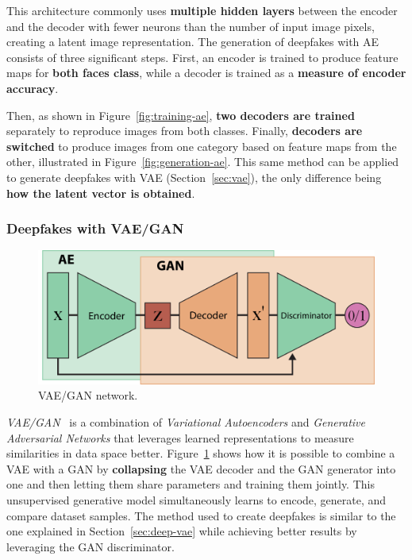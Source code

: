 \documentclass[sn-mathphys,Numbered]{sn-jnl}
\theoremstyle{thmstyleone}%
\theoremstyle{thmstyletwo}%
\theoremstyle{thmstylethree}%
\begin{document}
This architecture commonly uses \textbf{multiple hidden layers} between the encoder and the decoder with fewer neurons than the number of input image pixels, creating a latent image representation. 
The generation of deepfakes with AE consists of three significant steps.
First, an encoder is trained to produce feature maps for \textbf{both faces class}, while a decoder is trained as a \textbf{measure of encoder accuracy}. 

Then, as shown in Figure~\ref{fig:training-ae}, \textbf{two decoders are trained} separately to reproduce images from both classes. Finally, \textbf{decoders are switched} to produce images from one category based on feature maps from the other, illustrated in Figure~\ref{fig:generation-ae}. This same method can be applied to generate deepfakes with VAE (Section~\ref{sec:vae}), the only difference being \textbf{how the latent vector is obtained}.



\subsubsection{Deepfakes with VAE/GAN}\label{sect:vaegan}

\begin{figure}[b]
	\centering
    \includegraphics[scale=0.75]{img/svg/VaeGan.png}
	\caption{VAE/GAN network.}\label{fig:vae-gan}
\end{figure}


\emph{VAE/GAN}~\cite{larsen2016autoencoding} is a combination of \emph{Variational Autoencoders} and \emph{Generative Adversarial Networks} that leverages learned representations to measure similarities in data space better. Figure~\ref{fig:vae-gan} shows how it is possible to combine a VAE with a GAN by \textbf{collapsing} the VAE decoder and the GAN generator  into one and then letting them share parameters and training them jointly.
This unsupervised generative model simultaneously learns to encode, generate, and compare dataset samples. 
The method used to create deepfakes is similar to the one explained in Section~\ref{sec:deep-vae} while achieving  better results by leveraging the GAN discriminator.
\end{document}
